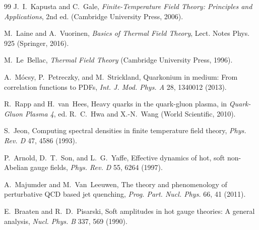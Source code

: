 \documentclass[12pt,a4paper]{article}
\begin{document}
\begin{thebibliography}{99}
\footnotesize
{} J.~I.~Kapusta and C.~Gale,
\textit{Finite-Temperature Field Theory: Principles and Applications},
2nd ed. (Cambridge University Press, 2006).

 M.~Laine and A.~Vuorinen,
\textit{Basics of Thermal Field Theory},
Lect. Notes Phys. 925 (Springer, 2016).

 M.~Le~Bellac,
\textit{Thermal Field Theory} (Cambridge University Press, 1996).

 A.~Mócsy, P.~Petreczky, and M.~Strickland,
Quarkonium in medium: From correlation functions to PDFs,
\textit{Int. J. Mod. Phys. A} 28, 1340012 (2013).

 R.~Rapp and H.~van~Hees,
Heavy quarks in the quark-gluon plasma, in
\textit{Quark-Gluon Plasma 4}, ed. R.~C.~Hwa and X.-N.~Wang
(World Scientific, 2010).

 S.~Jeon,
Computing spectral densities in finite temperature field theory,
\textit{Phys. Rev. D} 47, 4586 (1993).

 P.~Arnold, D.~T.~Son, and L.~G.~Yaffe,
Effective dynamics of hot, soft non-Abelian gauge fields,
\textit{Phys. Rev. D} 55, 6264 (1997).

 A.~Majumder and M.~Van~Leeuwen,
The theory and phenomenology of perturbative QCD based jet quenching,
\textit{Prog. Part. Nucl. Phys.} 66, 41 (2011).

 E.~Braaten and R.~D.~Pisarski,
Soft amplitudes in hot gauge theories: A general analysis,
\textit{Nucl. Phys. B} 337, 569 (1990).
\end{thebibliography}
\end{document}

